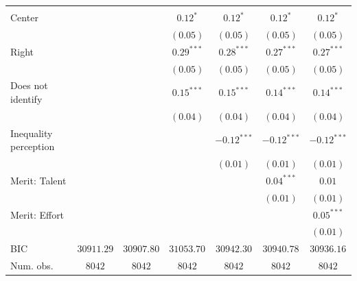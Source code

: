 \documentclass[
  12pt,
  a4paper,
]{article}
\begin{document}
\begin{table}[!ht]
\begin{center}
{\begin{tabular}{l c c c c c c}
                                    &               &               &               &               &               &               \\
\quad Center                        &               &               & $0.12^{*}$    & $0.12^{*}$    & $0.12^{*}$    & $0.12^{*}$    \\
                                    &               &               & $(0.05)$      & $(0.05)$      & $(0.05)$      & $(0.05)$      \\
\quad Right                         &               &               & $0.29^{***}$  & $0.28^{***}$  & $0.27^{***}$  & $0.27^{***}$  \\
                                    &               &               & $(0.05)$      & $(0.05)$      & $(0.05)$      & $(0.05)$      \\
\quad Does not identify             &               &               & $0.15^{***}$  & $0.15^{***}$  & $0.14^{***}$  & $0.14^{***}$  \\
                                    &               &               & $(0.04)$      & $(0.04)$      & $(0.04)$      & $(0.04)$      \\
Inequality perception               &               &               &               & $-0.12^{***}$ & $-0.12^{***}$ & $-0.12^{***}$ \\
                                    &               &               &               & $(0.01)$      & $(0.01)$      & $(0.01)$      \\
Merit: Talent                       &               &               &               &               & $0.04^{***}$  & $0.01$        \\
                                    &               &               &               &               & $(0.01)$      & $(0.01)$      \\
Merit: Effort                       &               &               &               &               &               & $0.05^{***}$  \\
                                    &               &               &               &               &               & $(0.01)$      \\
\hline
BIC                                 & $30911.29$    & $30907.80$    & $31053.70$    & $30942.30$    & $30940.78$    & $30936.16$    \\
Num. obs.                           & $8042$        & $8042$        & $8042$        & $8042$        & $8042$        & $8042$        \\

\end{tabular}}
\end{center}
\end{table}
\end{document}
